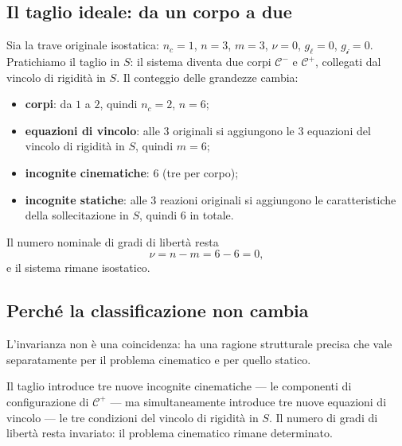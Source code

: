 \subsection{Il taglio ideale: da un corpo a due}
\label{sec:taglio_ideale}

Sia la trave originale isostatica: $n_c = 1$, $n = 3$,
$m = 3$, $\nu = 0$, $g_\ell = 0$, $g_{\mathscr{i}} = 0$.
Pratichiamo il taglio in $S$: il sistema diventa due
corpi $\mathcal{C}^-$ e $\mathcal{C}^+$, collegati dal
vincolo di rigidità in $S$. Il conteggio delle grandezze
cambia:
\begin{itemize}[nosep]
	\item \textbf{corpi}: da $1$ a $2$, quindi
	$n_c = 2$, $n = 6$;
	\item \textbf{equazioni di vincolo}: alle $3$
	originali si aggiungono le $3$ equazioni del
	vincolo di rigidità in $S$, quindi $m = 6$;
	\item \textbf{incognite cinematiche}: $6$ (tre per
	corpo);
	\item \textbf{incognite statiche}: alle $3$ reazioni
	originali si aggiungono le caratteristiche della
	sollecitazione in $S$, quindi $6$ in totale.
\end{itemize}
Il numero nominale di gradi di libertà resta
\begin{equation}
	\nu = n - m = 6 - 6 = 0,
\end{equation}
e il sistema rimane isostatico.

\subsection{Perché la classificazione non cambia}
\label{sec:perche_invarianza}

L'invarianza non è una coincidenza: ha una ragione
strutturale precisa che vale separatamente per il
problema cinematico e per quello statico.

Il taglio introduce tre nuove incognite cinematiche
--- le componenti di configurazione di $\mathcal{C}^+$
--- ma simultaneamente introduce tre nuove equazioni
di vincolo --- le tre condizioni del vincolo di rigidità
in $S$. Il numero di gradi di libertà resta invariato:
il problema cinematico rimane determinato.

